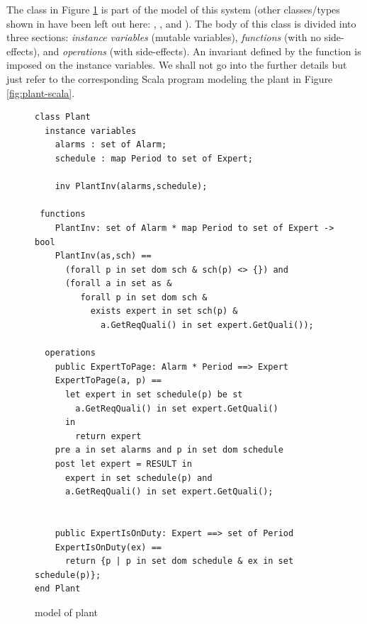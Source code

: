 The \vdmpp{} class  in Figure \ref{fig:plant-vdm} 
is part of the model of this system (other classes/types shown in
\cite{vdmplusplus05} have been left out here: 
, , and ).
The body of this class is divided into three sections: {\em 
instance variables} (mutable variables), {\em functions} (with no 
side-effects), and {\em operations} (with side-effects). An 
invariant defined by the function  is imposed on 
the instance variables. We shall not go into the further details
but just refer to the corresponding Scala program modeling the 
plant in Figure \ref{fig:plant-scala}.

\begin{figure}
\begin{lstlisting}[language=vdm,frame=single,backgroundcolor=\color{light-gray}]
class Plant
  instance variables
    alarms : set of Alarm;
    schedule : map Period to set of Expert;
    
    inv PlantInv(alarms,schedule);

 functions
    PlantInv: set of Alarm * map Period to set of Expert -> bool
    PlantInv(as,sch) ==
      (forall p in set dom sch & sch(p) <> {}) and
      (forall a in set as &
         forall p in set dom sch & 
           exists expert in set sch(p) &
             a.GetReqQuali() in set expert.GetQuali());

  operations
    public ExpertToPage: Alarm * Period ==> Expert
    ExpertToPage(a, p) ==
      let expert in set schedule(p) be st
        a.GetReqQuali() in set expert.GetQuali()
      in
        return expert
    pre a in set alarms and p in set dom schedule
    post let expert = RESULT in
      expert in set schedule(p) and
      a.GetReqQuali() in set expert.GetQuali();
		
		 
    public ExpertIsOnDuty: Expert ==> set of Period
    ExpertIsOnDuty(ex) ==
      return {p | p in set dom schedule & ex in set schedule(p)};
end Plant
\end{lstlisting}
\caption{\vdmpp{} model of plant}
\label{fig:plant-vdm}
\end{figure}

